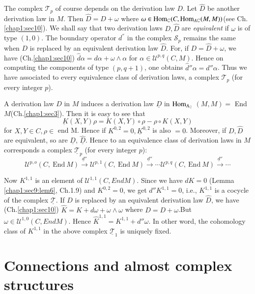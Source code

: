 The complex $\mathscr{T}_p$ of course depends on the derivation law $D$. Let
$\hat{D}$ be another derivation law in $M$. Then $\hat{D} = D
+ \omega$ where $\omega \in \operatorname{Hom}_{\mathbb{C}} (C, \operatorname{Hom}_{A
  \mathbb{C}}(M, M))$\pageoriginale (see Ch. \ref{chap1:sec10}). We shall say that two
derivation laws $D, \hat{D}$ are \textit{equivalent} if $\omega$
is of type $(1, 0)$. The boundary operator $d^{''}$ in the complex
$\mathscr{S}_p$ remains the same when $D$ is replaced by an equivalent
derivation  law $\hat{D}$. For, if $D = \hat{D} + \omega$, we
have (Ch.\ref{chap1:sec10}) $\hat{d} \alpha = d \alpha + \omega \wedge \alpha$
for $\alpha \in \mathscr{U}^{p, q} (C, M)$. Hence on computing the
components of type $(p, q +  1)$, one obtains $\hat{d}'' \alpha = d''
\alpha$. Thus we have associated to every equivalence class of
derivation laws, a complex $\mathscr{T}_p$ (for every integer $p$). 

A derivation law $D$ in $M$ induces a derivation law $\underline{D}$
in $\operatorname{Hom}_{A_\mathbb{C}}$ $(M, M) = $ End $M$(Ch.\ref{chap1:sec3}). Then it is easy
to see that 
$$
\underbar{K} (X, Y) \rho = K (X, Y)\circ \rho - \rho \circ K (X, Y)
$$
for $X, Y \in C, \rho \in$ end M. Hence if $K^{0, 2} = 0,
\underline{K}^{0, 2}$ is also $= 0$. Moreover, if $D, \hat{D}$ are
equivalent, so are $\underline{D}$, $\underline{\hat{D}}$. Hence to an
equivalence class of derivation laws in $M$ corresponds a complex
$\underline{\mathscr{T}}_p$ (for every integer $p$):  
$$
\mathscr{U}^{p, o} (C, ~\text{End}~ M) \xrightarrow{\underline{d}''}
\mathscr{U}^{p, 1} (C, ~\text{End}~ M) \xrightarrow{\underline{d}''} \cdots
\mathscr{U}^{p, q} (C, ~\text{End}~ M) \xrightarrow {\underline{d}''} \cdots 
$$

Now $K^{1, 1}$ is an element of $\mathscr{U}^{1, 1}(C, E nd M)$. Since
we have $dK = 0$ (Lemma \ref{chap1:sec9:lem6}, Ch.1.9) and $K^{0, 2}= 0$, we get $d''
K^{1, 1} = 0$, i.e., $K^{1, 1}$ is a cocycle of the complex
$\underline{\mathscr{T}}$. If $D$ is replaced by an equivalent derivation
law $\hat{D}$, we have (Ch.\ref{chap1:sec10}) $\hat{K} = K + d \omega + \omega
\wedge \omega$ where $\hat{D} = D + \omega$.\pageoriginale But $\omega \in
\mathscr{U}^{1, 0} (C, End M)$. Hence $\hat{K}^{1, 1} = K^{1,1} + d''
\omega$. In other word, the cohomology class of $K^{1, 1}$ in the above
complex $\underline{\mathscr{T}}_1$ is uniquely fixed. 

\section{Connections and almost complex structures}\label{chap6:sec4}%

